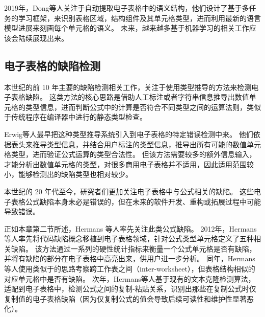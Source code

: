 2019年，Dong等人\cite{dong2019semantic}关注于自动提取电子表格中的语义结构，他们设计了基于多任务的学习框架，来识别表格区域，结构组件及其单元格类型，进而利用最新的语言模型进展来刻画每个单元格的语义。
未来，越来越多基于机器学习的相关工作应该会陆续展现出来。

\subsection{电子表格的缺陷检测}
本世纪的前 10 年主要的缺陷检测相关工作，关注于使用类型推导的方法\cite{erwig2002adding,burnett2002testing,ahmad2003type,abraham2004header,abraham2006type,abraham2007ucheck,antoniu2004validating,chambers2009automatic,chambers2010reasoning}来检测电子表格缺陷。
这类方法的核心思路是借助人工标注或者字符串信息推导出数值单元格的类型信息，进而判断公式中的计算是否符合不同类型之间的运算法则，类似于传统程序在编译器中进行的静态类型检查。

Erwig等人\cite{erwig2002adding,abraham2004header,chambers2009automatic}最早把这种类型推导系统引入到电子表格的特定错误检测中来。
他们依据表头来推导类型信息，并结合用户标注的类型信息，推导出所有可能的数值单元格类型，进而验证公式运算的类型合法性。
但该方法需要较多的额外信息输入，才能分析出数值单元格的类型，对很多商用电子表格并不适用，因此适用范围较小，能够检测出的缺陷类型也相对较少。

本世纪的 20 年代至今，研究者们更加关注电子表格中与公式相关的缺陷。
这些电子表格公式缺陷本身未必是错误的，但在未来的软件开发、重构或拓展过程中可能导致错误。

正如本章第二节所述，Hermans 等人\cite{hermans2012detecting,hermans2012detecting2,hermans2013data}率先关注此类公式缺陷。
2012年，Hermans等人\cite{hermans2012detecting2}率先将代码缺陷概念移植到电子表格领域，针对公式类型单元格定义了五种相关缺陷。
该方法通过一系列的硬性统计指标来衡量一个公式单元格是否有缺陷，并将有缺陷的部分在电子表格中高亮出来，供用户进一步分析。
同年，Hermans等人\cite{hermans2012detecting}使用类似于\cite{hermans2012detecting2}的思路考察跨工作表之间（inter-worksheet），但表格结构相似的对应单元格中是否有缺陷。
次年，Hermans等人\cite{hermans2013data}基于现有的文本克隆检测算法，适配到电子表格中，检测公式之间的复制-粘贴关系，识别出那些在复制公式时仅复制值的电子表格缺陷（因为仅复制公式的值会导致后续可读性和维护性显著恶化）。

